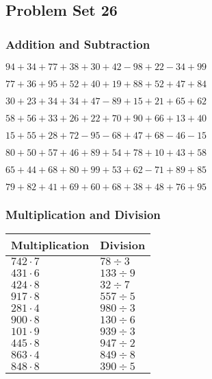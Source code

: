 \hypertarget{problem-set-26}{%
\subsection{Problem Set 26}\label{problem-set-26}}

\hypertarget{addition-and-subtraction}{%
\subsubsection{Addition and
Subtraction}\label{addition-and-subtraction}}

\(94+34+77+38+30+42-98+22-34+99\)

\(77+36+95+52+40+19+88+52+47+84\)

\(30+23+34+34+47-89+15+21+65+62\)

\(58+56+33+26+22+70+90+66+13+40\)

\(15+55+28+72-95-68+47+68-46-15\)

\(80+50+57+46+89+54+78+10+43+58\)

\(65+44+68+80+99+53+62-71+89+85\)

\(79+82+41+69+60+68+38+48+76+95\)

\hypertarget{multiplication-and-division}{%
\subsubsection{Multiplication and
Division}\label{multiplication-and-division}}

\begin{longtable}[]{@{}ll@{}}
\toprule
Multiplication & Division\tabularnewline
\midrule
\endhead
\(742\cdot7\) & \(78÷3\)\tabularnewline
\(431\cdot6\) & \(133÷9\)\tabularnewline
\(424\cdot8\) & \(32÷7\)\tabularnewline
\(917\cdot8\) & \(557÷5\)\tabularnewline
\(281\cdot4\) & \(980÷3\)\tabularnewline
\(900\cdot8\) & \(130÷6\)\tabularnewline
\(101\cdot9\) & \(939÷3\)\tabularnewline
\(445\cdot8\) & \(947÷2\)\tabularnewline
\(863\cdot4\) & \(849÷8\)\tabularnewline
\(848\cdot8\) & \(390÷5\)\tabularnewline
\bottomrule
\end{longtable}
